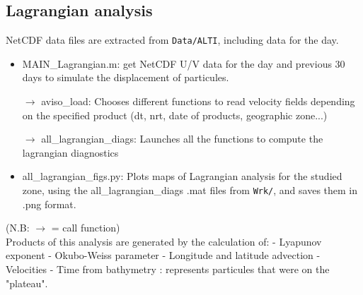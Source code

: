 \documentclass[12pt,a4paper]{article}
\begin{document}
\subsection{Lagrangian analysis}
NetCDF data files are extracted from \texttt{Data/ALTI}, including data for the day.
\begin{itemize}
\item MAIN\_Lagrangian.m: get NetCDF U/V data for the day and previous 30 days to simulate the displacement of particules. \newline

$\rightarrow$ aviso\_load: Chooses different functions to read velocity fields depending on the specified product (dt, nrt, date of products, geographic zone...) \newline

$\rightarrow$ all\_lagrangian\_diags: Launches all the functions to compute the lagrangian diagnostics \newline

\item all\_lagrangian\_figs.py: Plots maps of Lagrangian analysis for the studied zone, using the all\_lagrangian\_diags .mat files from \texttt{Wrk/}, and saves them in .png format.\newline
\end{itemize}
(N.B: $\rightarrow$ = call function)\\ %
\newline
Products of this analysis are generated by the calculation of: \newline
- Lyapunov exponent \newline
- Okubo-Weiss parameter \newline
- Longitude and latitude advection \newline
- Velocities \newline
- Time from bathymetry : represents particules that were on the "plateau".
\end{document}

